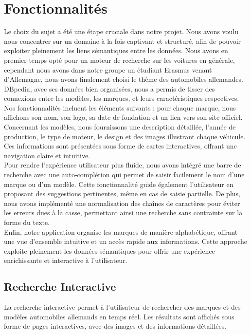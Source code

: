 \documentclass[a4paper]{article}
\begin{document}
\section{Fonctionnalités}
Le choix du sujet a été une étape cruciale dans notre projet. Nous avons voulu nous concentrer sur un domaine à la fois captivant et structuré, afin de pouvoir exploiter pleinement les liens sémantiques entre les données. Nous avons en premier temps opté pour un moteur de recherche sur les voitures en générale, cependant nous avons dans notre groupe un étudiant Erasmus venant d'Allemagne, nous avons finalement choisi le thème des automobiles allemandes. DBpedia, avec ses données bien organisées, nous a permis de tisser des connexions entre les modèles, les marques, et leurs caractéristiques respectives. \\ 

Nos fonctionnalités incluent les éléments suivants : pour chaque marque, nous affichons son nom, son logo, sa date de fondation et un lien vers son site officiel. Concernant les modèles, nous fournissons une description détaillée, l'année de production, le type de moteur, le design et des images illustrant chaque véhicule. Ces informations sont présentées sous forme de cartes interactives, offrant une navigation claire et intuitive. \\

Pour rendre l'expérience utilisateur plus fluide, nous avons intégré une barre de recherche avec une auto-complétion qui permet de saisir facilement le nom d'une marque ou d'un modèle. Cette fonctionnalité guide également l'utilisateur en proposant des suggestions pertinentes, même en cas de saisie partielle. De plus, nous avons implémenté une normalisation des chaînes de caractères pour éviter les erreurs dues à la casse, permettant ainsi une recherche sans contrainte sur la forme du texte. \\

Enfin, notre application organise les marques de manière alphabétique, offrant une vue d'ensemble intuitive et un accès rapide aux informations. Cette approche exploite pleinement les données sémantiques pour offrir une expérience enrichissante et interactive à l'utilisateur.

\subsection{Recherche Interactive}
La recherche interactive permet à l'utilisateur de rechercher des marques et des modèles automobiles allemands en temps réel. Les résultats sont affichés sous forme de pages interactives, avec des images et des informations détaillées.
\end{document}
